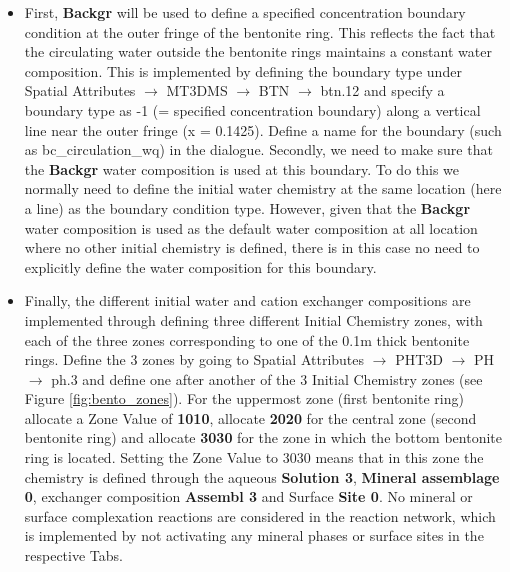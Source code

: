 \begin{itemize}
\item First, {\color{red} \textbf{Backgr}} will be used to define a specified 
concentration boundary condition at the outer fringe of the bentonite ring.
This reflects the fact that the circulating water outside the bentonite rings 
maintains a constant water composition. This is implemented by 
defining the boundary type under {\color{blue}Spatial Attributes} $\rightarrow$ {\color{blue}MT3DMS} $\rightarrow$ {\color{blue}BTN} $\rightarrow$ {\color{blue}btn.12} and specify a boundary 
type as -1 (= specified concentration boundary) along a vertical line near the outer fringe (x = 0.1425).
Define a name for the boundary (such as bc\_circulation\_wq) in the dialogue.
Secondly, we need to make sure that the {\color{red} \textbf{Backgr}} water composition
is used at this boundary. To do this we normally need to define the initial water chemistry 
at the same location (here a line) as the boundary condition type. 
However, given that the {\color{red} \textbf{Backgr}} water composition is used 
as the default water composition at all location where no other initial chemistry is defined,
there is in this case no need to explicitly define the water composition for this boundary.   

\item Finally, the different initial water and cation exchanger compositions are implemented
through defining three different {\color{blue}Initial Chemistry} zones, with each 
of the three zones corresponding to one of the 0.1m thick bentonite rings.  
Define the 3 zones by going to 
{\color{blue}Spatial Attributes} $\rightarrow$ 
{\color{blue}PHT3D} $\rightarrow$ 
{\color{blue}PH} $\rightarrow$ {\color{blue}ph.3} and define one after another 
of the 3 {\color{blue}Initial Chemistry} zones (see Figure \ref{fig:bento_zones}). 
For the uppermost zone (first bentonite ring) allocate a {\color{blue}Zone Value} of {\color{red} \textbf{1010}}, 
allocate {\color{red} \textbf{2020}} for the central zone (second bentonite ring) and allocate 
{\color{red} \textbf{3030}} for the zone in which the bottom bentonite ring is located.
Setting the {\color{blue}Zone Value} to 3030 means that in this zone the chemistry is defined
through the aqueous {\color{red} \textbf{Solution 3}}, {\color{red} \textbf{Mineral assemblage 0}},
exchanger composition {\color{red} \textbf{Assembl 3}} and Surface {\color{red} \textbf{Site 0}}.
No mineral or surface complexation reactions are considered in the reaction network,
which is implemented by not activating any mineral phases or surface sites in the respective Tabs.  
 

\end{itemize}

